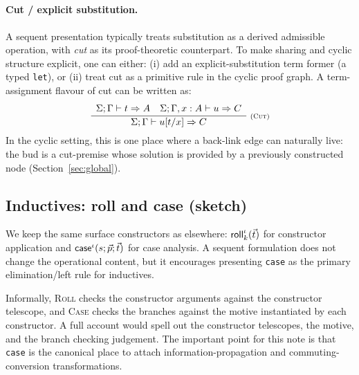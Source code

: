 \begin{Rules}
\qquad
{}
\\
\\[2mm]
\\
\end{Rules}

\paragraph{Cut / explicit substitution.}
A sequent presentation typically treats substitution as a derived admissible operation, with \emph{cut} as its proof-theoretic counterpart.
To make sharing and cyclic structure explicit, one can either:
(i) add an explicit-substitution term former (a typed \texttt{let}), or
(ii) treat cut as a primitive rule in the cyclic proof graph.
A term-assignment flavour of cut can be written as:
\[
  \Infer{Cut}{\env;\ctx \vdash t \Rightarrow A \quad \env;\ctx,x:A \vdash u \Rightarrow C}{\env;\ctx \vdash u[t/x] \Rightarrow C}
\]
In the cyclic setting, this is one place where a back-link edge can naturally live: the bud is a cut-premise whose solution is provided by a previously constructed node (Section~\ref{sec:global}).

\subsection{Inductives: roll and case (sketch)}

We keep the same surface constructors as elsewhere: \(\Roll{\iota}{k}{\vec{t}}\) for constructor application and \(\Case{\iota}{s}{\vec{p}}{\vec{t}}\) for case analysis.
A sequent formulation does not change the operational content, but it encourages presenting \texttt{case} as the primary elimination/left rule for inductives.

\begin{Rules}
\qquad
{}
\end{Rules}

Informally, \textsc{Roll} checks the constructor arguments against the constructor telescope, and \textsc{Case} checks the branches against the motive instantiated by each constructor.
A full account would spell out the constructor telescopes, the motive, and the branch checking judgement.
The important point for this note is that \texttt{case} is the canonical place to attach information-propagation and commuting-conversion transformations.

